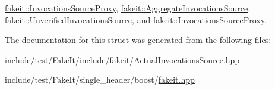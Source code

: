 \mbox{\hyperlink{structfakeit_1_1InvocationsSourceProxy_af06b5d62b0c4ff1e3048fae5d7ddd8c3}{fakeit\+::\+Invocations\+Source\+Proxy}}, \mbox{\hyperlink{structfakeit_1_1AggregateInvocationsSource_a46d5ec34c9428d33be90ba03fecc1f44}{fakeit\+::\+Aggregate\+Invocations\+Source}}, \mbox{\hyperlink{structfakeit_1_1UnverifiedInvocationsSource_a889468fefa500d0f7f524f8235a67b0c}{fakeit\+::\+Unverified\+Invocations\+Source}}, and \mbox{\hyperlink{structfakeit_1_1InvocationsSourceProxy_af06b5d62b0c4ff1e3048fae5d7ddd8c3}{fakeit\+::\+Invocations\+Source\+Proxy}}.



The documentation for this struct was generated from the following files\+:\begin{DoxyCompactItemize}
\item 
include/test/\+Fake\+It/include/fakeit/\mbox{\hyperlink{ActualInvocationsSource_8hpp}{Actual\+Invocations\+Source.\+hpp}}\item 
include/test/\+Fake\+It/single\+\_\+header/boost/\mbox{\hyperlink{single__header_2boost_2fakeit_8hpp}{fakeit.\+hpp}}\end{DoxyCompactItemize}
